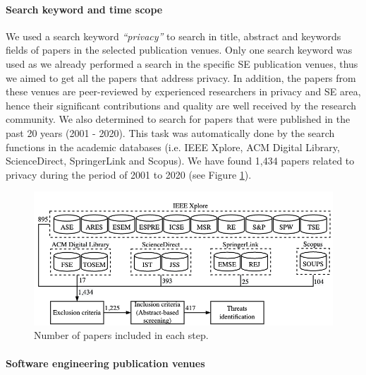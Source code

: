 
\paragraph{\textbf{Search keyword and time scope}}

We used a search keyword \emph{``privacy''} to search in title, abstract and keywords fields of papers in the selected publication venues. Only one search keyword was used as we already performed a search in the specific SE publication venues, thus we aimed to get all the papers that address privacy. In addition, the papers from these venues are peer-reviewed by experienced researchers in privacy and SE area, hence their significant contributions and quality are well received by the research community. We also determined to search for papers that were published in the past 20 years (2001 - 2020). This task was automatically done by the search functions in the academic databases (i.e. IEEE Xplore, ACM Digital Library, ScienceDirect, SpringerLink and Scopus). We have found 1,434 papers related to privacy during the period of 2001 to 2020 (see Figure \ref{fig:process-paper-selection}).

\begin{figure}[h]
	\centering
	\includegraphics[width=1.0\linewidth]{figures/process-paper-selection.png}
	\caption{Number of papers included in each step.}
	\label{fig:process-paper-selection}
\end{figure}

\paragraph{\textbf{Software engineering publication venues}}

